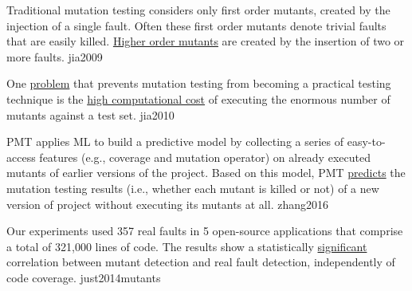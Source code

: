 \documentclass{article}
\begin{document}
  {Traditional mutation testing considers only first order mutants, created by the injection of a single fault. Often these first order mutants denote trivial faults that are easily killed. \ul{Higher order mutants} are created by the insertion of two or more faults.}
  {jia2009}

  {One \ul{problem} that prevents mutation testing from becoming a practical testing technique is the \ul{high computational cost} of executing the enormous number of mutants against a test set.}
  {jia2010}

  {PMT applies ML to build a predictive model by collecting a series of easy-to-access features (e.g., coverage and mutation operator) on already executed mutants of earlier versions of the project. Based on this model, PMT \ul{predicts} the mutation testing results (i.e., whether each mutant is killed or not) of a new version of project without executing its mutants at all.}
  {zhang2016}

  {Our experiments used 357 real faults in 5 open-source applications that comprise a total of 321,000 lines of code. The results show a statistically \ul{significant} correlation between mutant detection and real fault detection, independently of code coverage.}
  {just2014mutants}

\end{document}
